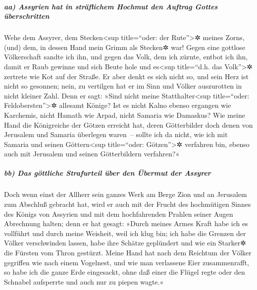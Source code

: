 \hypertarget{aa-assyrien-hat-in-struxe4flichem-hochmut-den-auftrag-gottes-uxfcberschritten}{%
\subparagraph{aa) Assyrien hat in sträflichem Hochmut den Auftrag Gottes
überschritten}\label{aa-assyrien-hat-in-struxe4flichem-hochmut-den-auftrag-gottes-uxfcberschritten}}

Wehe dem Assyrer, dem Stecken\textless sup title=``oder:
der Rute''\textgreater✲ meines Zorns, (und) dem, in dessen Hand mein
Grimm als Stecken✲ war! Gegen eine gottlose Völkerschaft
sandte ich ihn, und gegen das Volk, dem ich zürnte, entbot ich ihn,
damit er Raub gewinne und sich Beute hole und es\textless sup
title=``d.h. das Volk''\textgreater✲ zertrete wie Kot auf der Straße.
Er aber denkt es sich nicht so, und sein Herz ist nicht so
gesonnen; nein, zu vertilgen hat er im Sinn und Völker auszurotten in
nicht kleiner Zahl. Denn er sagt: »Sind nicht meine
Statthalter\textless sup title=``oder: Feldobersten''\textgreater✲
allesamt Könige? Ist es nicht Kalno ebenso ergangen wie
Karchemis, nicht Hamath wie Arpad, nicht Samaria wie Damaskus?
Wie meine Hand die Königreiche der Götzen erreicht hat,
deren Götterbilder doch denen von Jerusalem und Samaria überlegen
waren~-- sollte ich da nicht, wie ich mit Samaria und
seinen Göttern\textless sup title=``oder: Götzen''\textgreater✲
verfahren bin, ebenso auch mit Jerusalem und seinen Götterbildern
verfahren?«

\hypertarget{bb-das-guxf6ttliche-strafurteil-uxfcber-den-uxfcbermut-der-assyrer}{%
\subparagraph{bb) Das göttliche Strafurteil über den Übermut der
Assyrer}\label{bb-das-guxf6ttliche-strafurteil-uxfcber-den-uxfcbermut-der-assyrer}}

Doch wenn einst der Allherr sein ganzes Werk am Berge
Zion und an Jerusalem zum Abschluß gebracht hat, wird er auch mit der
Frucht des hochmütigen Sinnes des Königs von Assyrien und mit dem
hochfahrenden Prahlen seiner Augen Abrechnung halten;
denn er hat gesagt: »Durch meines Armes Kraft habe ich es
vollführt und durch meine Weisheit, weil ich klug bin; ich habe die
Grenzen der Völker verschwinden lassen, habe ihre Schätze geplündert und
wie ein Starker✲ die Fürsten vom Thron gestürzt. Meine
Hand hat nach dem Reichtum der Völker gegriffen wie nach einem
Vogelnest, und wie man verlassene Eier zusammenrafft, so habe ich die
ganze Erde eingesackt, ohne daß einer die Flügel regte oder den Schnabel
aufsperrte und auch nur zu piepen wagte.«

